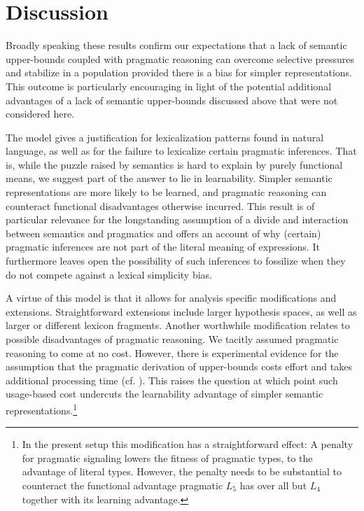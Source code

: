 \documentclass[10pt,a4paper]{article}
\begin{document}
\section{Discussion}
Broadly speaking these results confirm our expectations that a lack of semantic upper-bounds coupled with pragmatic reasoning can overcome selective pressures and stabilize in a population provided there is a bias for simpler representations. This outcome is particularly encouraging in light of the potential additional advantages of a lack of semantic upper-bounds discussed above that were not considered here. 

The model gives a justification for lexicalization patterns found in natural language, as well as for the failure to lexicalize certain pragmatic inferences. That is, while the puzzle raised by semantics is hard to explain by purely functional means, we suggest part of the answer to lie in learnability. Simpler semantic representations are more likely to be learned, and pragmatic reasoning can counteract functional disadvantages  otherwise incurred. This result is of particular relevance for the longstanding assumption of a divide and interaction between semantics and pragmatics and offers an account of why (certain) pragmatic inferences are not part of the literal meaning of expressions. It furthermore leaves open the possibility of such inferences to fossilize when they do not compete against a lexical simplicity bias.

A virtue of this model is that it allows for analysis specific modifications and extensions. Straightforward extensions include larger hypothesis spaces, as well as larger or different lexicon fragments. Another worthwhile modification relates to possible disadvantages of pragmatic reasoning. We tacitly assumed pragmatic reasoning to come at no cost. However, there is experimental evidence for the assumption that the pragmatic derivation of upper-bounds costs effort and takes additional processing time (cf. \citealt{deNeys+schaeken:2007, huang+snedeker:2009}). This raises the question at which point such usage-based cost undercuts the learnability advantage of simpler semantic representations.\footnote{In the present setup this modification has a straightforward effect: A penalty for pragmatic signaling lowers the fitness of pragmatic types, to the advantage of literal types. However, the penalty needs to be substantial to counteract the functional advantage pragmatic $L_5$ has over all but $L_4$ together with its learning advantage.}
\end{document}
